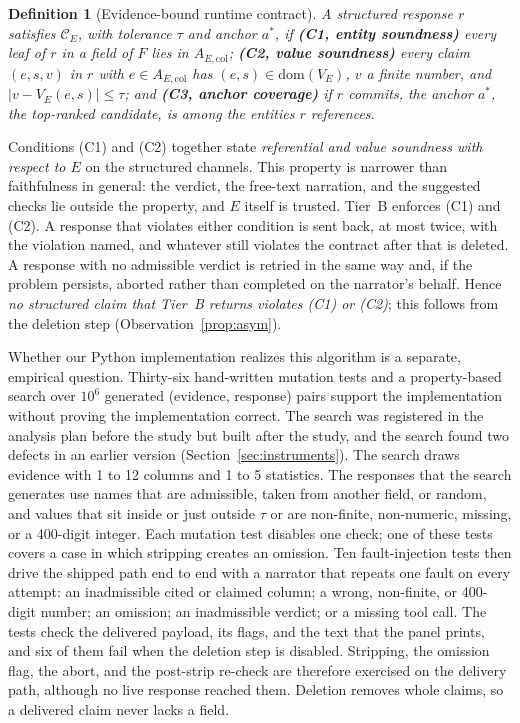\documentclass[journal]{IEEEtran}
\newtheorem{definitionx}{Definition}
\begin{document}
\begin{definitionx}[Evidence-bound runtime contract]\label{def:contract}
A structured response $r$ \emph{satisfies} $\mathcal{C}_E$, with tolerance
$\tau$ and anchor $a^*$, if \textbf{(C1, entity soundness)} every leaf of
$r$ in a field of $F$ lies in $A_{E,\mathrm{col}}$; \textbf{(C2, value
soundness)} every claim $(e,s,v)$ in $r$ with $e \in A_{E,\mathrm{col}}$ has
$(e,s) \in \mathrm{dom}(V_E)$, $v$ a finite number, and
$|v - V_E(e,s)| \le \tau$; and \textbf{(C3, anchor coverage)} if $r$
commits, the anchor $a^*$, the top-ranked candidate, is among the entities
$r$ references.
\end{definitionx}

Conditions (C1) and (C2) together state \emph{referential and value soundness
with respect to $E$} on the structured channels. This property is narrower
than faithfulness in general: the verdict, the free-text narration, and the
suggested checks lie outside the property, and $E$ itself is trusted. Tier~B
enforces (C1) and (C2). A response that violates either condition is sent
back, at most twice, with the violation named, and whatever still violates the
contract after that is deleted. A response with no admissible verdict is
retried in the same way and, if the problem persists, aborted rather than
completed on the narrator's behalf. Hence \emph{no structured claim that
Tier~B returns violates (C1) or (C2)}; this follows from the deletion step
(Observation~\ref{prop:asym}).

Whether our Python implementation realizes this algorithm is a separate,
empirical question. Thirty-six hand-written mutation tests and a
property-based search over $10^6$ generated (evidence, response) pairs support
the implementation without proving the implementation correct. The search was
registered in the analysis plan before the study but built after the study,
and the search found two defects in an earlier version
(Section~\ref{sec:instruments}). The search draws evidence with 1 to 12
columns and 1 to 5 statistics. The responses that the search generates use
names that are admissible, taken from another field, or random, and values
that sit inside or just outside $\tau$ or are non-finite, non-numeric,
missing, or a 400-digit integer. Each mutation test disables one check; one of
these tests covers a case in which stripping creates an omission. Ten
fault-injection tests then drive the shipped path end to end with a narrator
that repeats one fault on every attempt: an inadmissible cited or claimed
column; a wrong, non-finite, or 400-digit number; an omission; an
inadmissible verdict; or a missing tool call. The tests check the delivered
payload, its flags, and the text that the panel prints, and six of them fail
when the deletion step is disabled. Stripping, the omission flag, the abort,
and the post-strip re-check are therefore exercised on the delivery path,
although no live response reached them. Deletion removes whole claims, so a
delivered claim never lacks a field.
\end{document}
